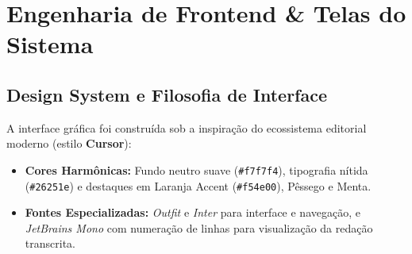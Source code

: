 \documentclass[11pt,a4paper]{article}
\begin{document}
\section{Engenharia de Frontend \& Telas do Sistema}

\subsection{Design System e Filosofia de Interface}
A interface gráfica foi construída sob a inspiração do ecossistema editorial moderno (estilo \textbf{Cursor}):
\begin{itemize}[leftmargin=1.5em]
    \item \textbf{Cores Harmônicas:} Fundo neutro suave (\texttt{\#f7f7f4}), tipografia nítida (\texttt{\#26251e}) e destaques em Laranja Accent (\texttt{\#f54e00}), Pêssego e Menta.
    \item \textbf{Fontes Especializadas:} \textit{Outfit} e \textit{Inter} para interface e navegação, e \textit{JetBrains Mono} com numeração de linhas para visualização da redação transcrita.
\end{itemize}
\end{document}
